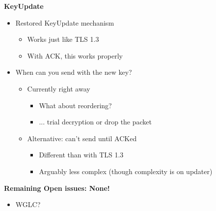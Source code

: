 \documentclass[helvetica]{seminar}
\newcommand{\heading}[1]{%
  \begin{center} 
    \large\bf 
    #1 
  \end{center} 
  \vspace{.4 in}}
\begin{document}
\begin{slide}
  \heading{KeyUpdate}

  \begin{itemize}
  \item Restored KeyUpdate mechanism
    \begin{itemize}
    \item Works just like TLS 1.3
    \item With ACK, this works properly
    \end{itemize}

  \item When can you send with the new key?
    \begin{itemize}
    \item Currently right away
      \begin{itemize}
      \item What about reordering?
      \item ... trial decryption or drop the packet        
      \end{itemize}

    \item Alternative: can't send until ACKed
      \begin{itemize}
      \item Different than with TLS 1.3
      \item Arguably less complex (though complexity is on updater)
      \end{itemize}
    \end{itemize}
  \end{itemize}

\end{slide}


\begin{slide}
\heading{Remaining Open issues: None!}

\begin{itemize}
\item WGLC?
\end{itemize}
\end{slide}



\centerslidestrue
\end{document}
